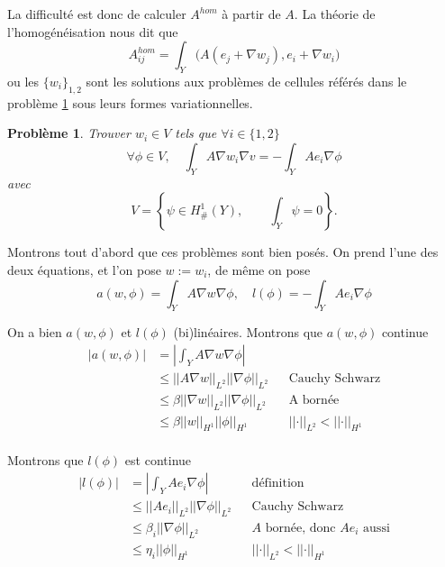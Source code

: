 \documentclass[11pt]{article}
\newtheorem{pb}{Problème}
\newcommand{\Ah}{A^{hom}}
\newcommand{\norm}[1]{\left|\left|#1\right|\right|}
\newcommand{\Hd}{H^1_{\#}}
\begin{document}
La difficulté est donc de calculer $\Ah$ à partir de $A$. La théorie de l'homogénéisation nous dit que
\begin{equation}
  \label{eq:Ah}
  \Ah_{ij} = \int_Y \big(A(e_j+\nabla w_j), e_i+\nabla w_i\big)
\end{equation}
ou les $\{w_i\}_{1,2}$ sont les solutions aux problèmes de cellules référés dans le problème \ref{pb:cell} sous leurs
formes variationnelles.
\begin{pb}
  \label{pb:cell}
  Trouver $w_i \in V$ tels que $\forall i \in \{1,2\}$
  \begin{equation}
    \forall \phi \in V, \quad \int_Y A \nabla w_i \nabla v = - \int_Y A e_i \nabla \phi 
  \end{equation}
  avec
  \[
    V = 
    \left\{
      \psi \in \Hd(Y), \qquad \int_Y \psi = 0
    \right\}.
  \]
\end{pb}

Montrons tout d'abord que ces problèmes sont bien posés. On prend l'une des deux équations, et l'on pose $w:=w_i$, de même on pose
\[
  a(w,\phi) = \int_Y A \nabla w \nabla \phi, \quad
  l(\phi) = -\int_Y A e_i \nabla \phi 
\]

On a bien $a(w, \phi)$ et $l(\phi)$ (bi)linéaires. Montrons que $a(w, \phi)$ continue 
\begin{align*}
  \big|a(w,\phi)\big| &= \left| \int_Y A \nabla w \nabla \phi \right| \\
                   &\leq \norm{A\nabla w}_{L^2} \norm{\nabla \phi}_{L^2} && \mbox{Cauchy Schwarz} \\
                   &\leq \beta \norm{\nabla w}_{L^2} \norm{\nabla \phi}_{L^2} && \mbox{A bornée} \\
                   &\leq \beta \norm{w}_{H^1} \norm{\phi}_{H^1} && \norm{\cdot}_{L^2}<\norm{\cdot}_{H^1} \\
\end{align*}

Montrons que $l(\phi)$ est continue
\begin{align*}
  \big|l(\phi)\big| &= \left| \int_Y A e_i \nabla \phi \right|  && \text{définition} \\
                 &\leq \norm{Ae_i}_{L^2} \norm{\nabla \phi}_{L^2} && \text{Cauchy Schwarz} \\
                 &\leq \beta_i \norm{\nabla \phi}_{L^2} && \text{$A$ bornée, donc $A e_i$ aussi} \\
                 &\leq \eta_i \norm{\phi}_{H^1} && \norm{\cdot}_{L^2}<\norm{\cdot}_{H^1}
\end{align*}
\end{document}
